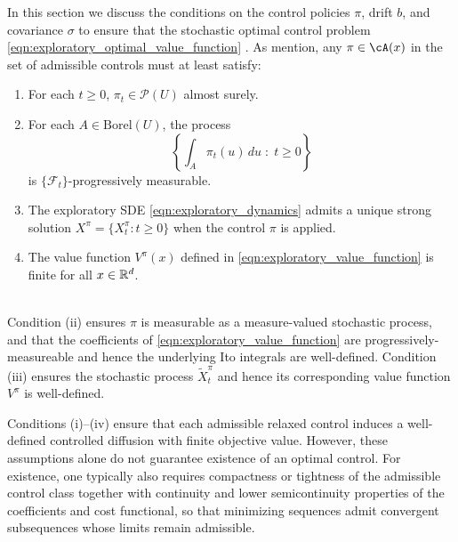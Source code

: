 In this section we discuss the conditions on the control policies $\pi$, drift $b$, and covariance $\sigma$ to ensure that the
stochastic optimal control problem \eqref{eqn:exploratory_optimal_value_function} . As \cite{wang2020_reinforcement_learning_stochastic_control} mention, any $\pi \in \cA(x)$ in the set of admissible
controls must at least satisfy:
%
\begin{enumerate}[label=(\roman*)]
    \item For each $t \ge 0$, $\pi_t \in \mathcal{P}(U)$ almost surely.

    \item For each $A \in \mathrm{Borel}(U)$, the process
    \[
    \left\{ \int_A \pi_t(u)\,du \;:\; t \ge 0 \right\}
    \]
    is $\{\mathcal{F}_t\}$-progressively measurable.

    \item The exploratory SDE \eqref{eqn:exploratory_dynamics} admits a unique strong solution
    $X^\pi = \{X^\pi_t : t \ge 0\}$ when the control $\pi$ is applied.

    \item The value function $V^\pi(x)$ defined in \eqref{eqn:exploratory_value_function} is finite for all $x \in \mathbb{R}^d$.
\end{enumerate}
%

\\

\noindent Condition (ii) ensures $\pi$ is measurable as a measure-valued stochastic process, and that the coefficients of \eqref{eqn:exploratory_value_function}
are progressively-measureable and hence the underlying Ito integrals are well-defined. Condition (iii) ensures the stochastic process $\tilde{X}^\pi_t$ and hence
its corresponding value function $V^\pi$ is well-defined.

Conditions (i)–(iv) ensure that each admissible relaxed control induces a well-defined controlled diffusion
with finite objective value. However, these assumptions alone do not
 guarantee existence of an optimal control. For existence, one typically also requires compactness or tightness
 of the admissible control class together with continuity and lower semicontinuity properties of the coefficients
and cost functional, so that minimizing sequences admit convergent subsequences whose limits remain admissible.


